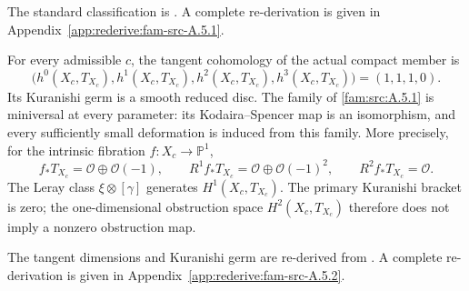 The standard classification is \citet[Theorem~1.4]{DuEtAl2026v1}. A complete re-derivation is given in Appendix~\ref{app:rederive:fam-src-A.5.1}.


\begin{theorem}\label{fam:src:A.5.2}\label{fam:st:A.5.2}\label{inv:D1.3}\label{inv:D2.1}\label{inv:D3.1}\label{cdp:st:E9}
For every admissible $c$, the tangent cohomology of the actual compact
member is
\[
 \bigl(h^0(X_c,T_{X_c}),h^1(X_c,T_{X_c}),h^2(X_c,T_{X_c}),
 h^3(X_c,T_{X_c})\bigr)=(1,1,1,0).
\]
Its Kuranishi germ is a smooth reduced disc. The family of \ref{fam:src:A.5.1} is
miniversal at every parameter: its Kodaira--Spencer map is an isomorphism,
and every sufficiently small deformation is induced from this family.
More precisely, for the intrinsic fibration $f:X_c\to\mathbb P^1$,
\[
 f_*T_{X_c}=\mathcal O\oplus\mathcal O(-1),\qquad
 R^1f_*T_{X_c}=\mathcal O\oplus\mathcal O(-1)^2,\qquad
 R^2f_*T_{X_c}=\mathcal O.\tag{D.4}
\]
The Leray class $\xi\otimes[\gamma]$ generates $H^1(X_c,T_{X_c})$.
The primary Kuranishi bracket is zero; the one-dimensional obstruction
space $H^2(X_c,T_{X_c})$ therefore does not imply a nonzero obstruction
map.

\end{theorem}


The tangent dimensions and Kuranishi germ are re-derived from \citet[Theorem~6.12 and Proposition~6.16]{DuEtAl2026v1}. A complete re-derivation is given in Appendix~\ref{app:rederive:fam-src-A.5.2}.


